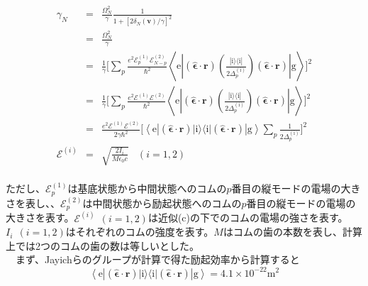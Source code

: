 \documentclass[uplatex, dvipdfmx, a4paper, report, papersize, 11pt]{jsbook}
\begin{document}
\begin{eqnarray}\label{approx_ex-rate}
  \gamma_N &=& \frac{\Omega^2_N}{\gamma}\frac{1}{1 + [2\delta_N(\bm{v})/\gamma]^2} \nonumber\\
  &=& \frac{\Omega^2_N}{\gamma}  \nonumber\\
  &=& \frac{1}{\gamma} \Biggl[ \sum _ { p } \frac { e ^ { 2 } \mathcal { E } ^{(1)}_ { p } \mathcal { E }^{(2)} _ { N - p } } { \hbar ^ { 2 } } \left\langle \mathrm { e } \left| ( \hat { \boldsymbol { \epsilon } } \cdot \mathbf { r } ) \left(  \frac { | \mathrm { i } \rangle \langle \mathrm { i } | } { 2 \Delta _ { p } ^ { ( \mathrm { i } ) } } \right) ( \hat { \boldsymbol { \epsilon } } \cdot \mathbf { r } ) \right| \mathrm { g } \right\rangle \Biggr]^2 \nonumber \\
  &=& \frac{1}{\gamma} \Biggl[ \sum _ { p } \frac { e ^ { 2 } \mathcal { E }^{(1)} \mathcal { E } ^ {(2)} } { \hbar ^ { 2 } } \left\langle \mathrm { e } \left| ( \hat { \boldsymbol { \epsilon } } \cdot \mathbf { r } ) \left(  \frac { | \mathrm { i } \rangle \langle \mathrm { i } | } { 2 \Delta _ { p } ^ { ( \mathrm { i } ) } } \right) ( \hat { \boldsymbol { \epsilon } } \cdot \mathbf { r } ) \right| \mathrm { g } \right\rangle \Biggr]^2 \nonumber \\
  &=& \frac{e^2  \mathcal { E } ^ {(1)} \mathcal { E } ^ {(2)}}{ 2 \gamma \hbar ^ { 2 }  }\Biggl[ \left\langle \mathrm { e } \left| ( \hat { \boldsymbol { \epsilon } } \cdot \mathbf { r } ) | \mathrm { i } \rangle \langle \mathrm { i } |  ( \hat { \boldsymbol { \epsilon } } \cdot \mathbf { r } ) \right| \mathrm { g } \right\rangle\sum _ { p }\frac{1}{2 \Delta _ { p } ^ { ( \mathrm { i } ) }} \Biggr]^2\\
  \mathcal{E}^{(i)} &=&  \sqrt{\frac{2 I_{i}}{M \epsilon_0 c}}\ \ \ \ (i = 1,2)
\end{eqnarray}\\
ただし、$\mathcal{E}^{(1)}_p$は基底状態から中間状態へのコムの$p$番目の縦モードの電場の大きさを表し、、$\mathcal{E}^{(2)}_p$は中間状態から励起状態へのコムの$p$番目の縦モードの電場の大きさを表す。$\mathcal{E}^{(i)}\ \ (i = 1,2)$は近似(c)の下でのコムの電場の強さを表す。$I_{i}\ \ (i = 1,2)$はそれぞれのコムの強度を表す。$M$はコムの歯の本数を表し、計算上では2つのコムの歯の数は等しいとした。\\
　まず、Jayichらのグループが計算で得た励起効率から計算すると
\begin{equation}
\left\langle \mathrm { e } \left| ( \hat { \boldsymbol { \epsilon } } \cdot \mathbf { r } ) | \mathrm { i } \rangle \langle \mathrm { i } |  ( \hat { \boldsymbol { \epsilon } } \cdot \mathbf { r } ) \right| \mathrm { g } \right\rangle = 4.1 \times 10^{-22}　\mathrm{m^2}
\end{equation}
\end{document}

